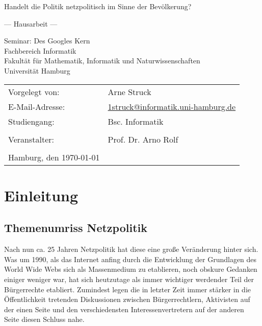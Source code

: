 \documentclass[
	12pt,
	a4paper,
	BCOR10mm,
	DIV14,
	listof=totoc,
	bibliography=totoc,
	headsepline
]{scrreprt}
\begin{document}
\begin{titlepage}
	\begin{center}
		{\titlefont\huge Handelt die Politik netzpolitisch im Sinne der Bevölkerung? \par}

		\bigskip
		\bigskip

		{\titlefont\Large --- Hausarbeit ---\par}

		\bigskip
		\bigskip

		{\large Seminar: Des Googles Kern\\
		Fachbereich Informatik\\
		Fakultät für Mathematik, Informatik und Naturwissenschaften\\
		Universität Hamburg\par}
	\end{center}

	\vfill

	{\large \begin{tabular}{ll}
		Vorgelegt von: & Arne Struck \\
		E-Mail-Adresse: 
			& \href{mailto:1struck@informatik.uni-hamburg.de}{1struck@informatik.uni-hamburg.de} \\ 
		Studiengang: & Bsc. Informatik \\
		\\
		Veranstalter: & Prof. Dr. Arno Rolf\\
		\\
		Hamburg, den \today
	\end{tabular}\par}
\end{titlepage}

\thispagestyle{empty}

\newpage\null\thispagestyle{empty}\newpage
\tableofcontents
\newpage\null\thispagestyle{empty}\newpage

\chapter{Einleitung}
\label{intro}

\section{Themenumriss Netzpolitik}
\label{themeintro}
Nach nun ca. 25 Jahren Netzpolitik hat diese eine große Veränderung hinter sich.
Was um 1990, als das Internet anfing durch die Entwicklung der Grundlagen des World Wide Webs sich als Massenmedium zu etablieren, noch obskure Gedanken einiger weniger war, hat sich heutzutage als immer wichtiger werdender Teil der Bürgerrechte etabliert.
Zumindest legen die in letzter Zeit immer stärker in die Öffentlichkeit tretenden Diskussionen zwischen Bürgerrechtlern, Aktivisten auf der einen Seite und den verschiedensten Interessenvertretern auf der anderen Seite diesen Schluss nahe. 
\end{document}
